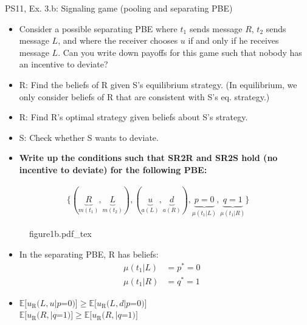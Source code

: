 \begin{frame}{PS11, Ex. 3.b: Signaling game (pooling and separating PBE)}
    \begin{itemize}
        \item[(b)] Consider a possible separating PBE where $t_1$ sends message $R$, $t_2$ sends message $L$, and where the receiver chooses $u$ if and only if he receives message $L$. Can you write down payoffs for this game such that nobody has an incentive to deviate?
    \end{itemize} \vspace{-8pt}
    \begin{multicols}{2}
      \begin{itemize}
        \item[SR3:] R: Find the beliefs of R given S's equilibrium strategy. (In equilibrium, we only consider beliefs of R that are consistent with S's eq. strategy.)
        \item[SR2R:] R: Find R's optimal strategy given beliefs about S's strategy.
        \item[SR2S:] S: Check whether S wants to deviate.
        \item[PBE:]  \textbf{Write up the conditions such that SR2R and SR2S hold (no incentive to deviate) for the following PBE:}
      \end{itemize}\vspace{-14pt}
      \begin{align*}
        \{(\underbrace{R}_{m(t_1)},\underbrace{L}_{m(t_2)}),(\underbrace{u}_{a(L)},\underbrace{d}_{a(R)}),\underbrace{p=0}_{\mu(t_1|L)},\underbrace{q=1}_{\mu(t_1|R)}\}
      \end{align*}
      \vfill\null\columnbreak
      \begin{figure}[!h]
        \center\def\svgwidth{\columnwidth}
        {figure1b.pdf_tex}
      \end{figure} \vspace{-8pt}
      \begin{itemize}
        \item[SR3:] In the separating PBE, R has beliefs:\vspace{-10pt}
        \begin{align*}
          \mu(t_1|L)&=p^*=0&\\
          \mu(t_1|R)&=q^*=1
        \end{align*}
        \item[SR2R:] \vspace{-6pt}
                     $\mathbb{E}[u_\text{R}(L,u|p$=$0)]\geq\mathbb{E}[u_\text{R}(L,d|p$=$0)]$\\
                     $\mathbb{E}[u_\text{R}(R,|q$=$1)]\geq \mathbb{E}[u_\text{R}(R,|q$=$1)]$
      \end{itemize}
      \vfill\null \columnbreak
      \vfill
    \end{multicols}
\end{frame}
